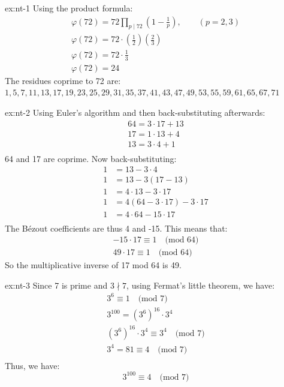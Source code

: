 \begin{solution}{ex:nt-1}
  Using the product formula:
  \[
    \begin{gathered}
      \varphi (72) = 72 \prod_{p\mid 72} (1-\frac{1}{p}), \qquad (p=2,3)\\
      \varphi (72) = 72 \cdot (\frac{1}{2})(\frac{2}{3})\\
      \varphi (72) = 72 \cdot \frac{1}{3}\\
      \varphi (72) = 24
    \end{gathered}
  \]
  The residues coprime to 72 are:\\ $1,5,7,11,13,17,19,23,25,29,31,35,37,41,43,47,49,53,55,59,61,65,67,71$\\
\end{solution}
\begin{solution}{ex:nt-2}
  Using Euler's algorithm and then back-substituting afterwards:
  \[
    \begin{gathered}
      64=3\cdot 17 + 13\\
      17=1\cdot 13 + 4\\
      13=3\cdot 4 + 1\\
    \end{gathered}
  \]
  64 and 17 are coprime. Now back-substituting:
  \[
    \begin{aligned}
      1&=13-3\cdot4\\
      1&=13-3(17-13)\\
      1&=4\cdot 13-3\cdot 17\\
      1&=4(64-3\cdot 17)-3\cdot 17\\
      1&=4\cdot 64 -15 \cdot 17\\
    \end{aligned}
  \]
  The Bézout coefficients are thus 4 and -15.
  This means that:
  \[
    \begin{gathered}
      -15\cdot17 \equiv 1 \quad\text{(mod 64)}\\
      49 \cdot 17 \equiv 1\quad \text{(mod 64)}
    \end{gathered}
  \]
  So the multiplicative inverse of 17 mod 64 is 49.

\end{solution}
\begin{solution}{ex:nt-3}
  Since 7 is prime and $3\nmid 7$, using Fermat's little theorem, we have:
  \[
    \begin{gathered}
      3^6\equiv 1 \quad \text{(mod 7)}\\
      3^{100}=(3^6)^{16}\cdot 3^4\\
      (3^6)^{16}\cdot 3^4\equiv 3^4 \quad \text{(mod 7)}\\
      3^4=81\equiv 4 \quad \text{(mod 7)}\\
    \end{gathered}
  \]
  Thus, we have:
  \[
    3^{100}\equiv 4 \quad \text{(mod 7)}
  \]
  
\end{solution}
